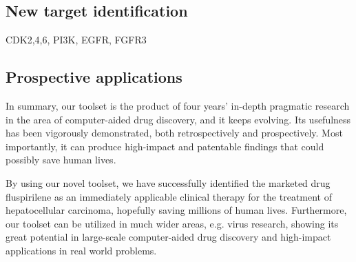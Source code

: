 \documentclass[a4paper,12pt]{article}
\begin{document}
\subsection*{New target identification}

CDK2,4,6, PI3K, EGFR, FGFR3

\subsection*{Prospective applications}

In summary, our toolset is the product of four years’ in-depth pragmatic research in the area of computer-aided drug discovery, and it keeps evolving. Its usefulness has been vigorously demonstrated, both retrospectively and prospectively. Most importantly, it can produce high-impact and patentable findings that could possibly save human lives.

By using our novel toolset, we have successfully identified the marketed drug fluspirilene as an immediately applicable clinical therapy for the treatment of hepatocellular carcinoma, hopefully saving millions of human lives. Furthermore, our toolset can be utilized in much wider areas, e.g. virus research, showing its great potential in large-scale computer-aided drug discovery and high-impact applications in real world problems.

\newpage
\linespread{0.5}
\tiny


\end{document}
